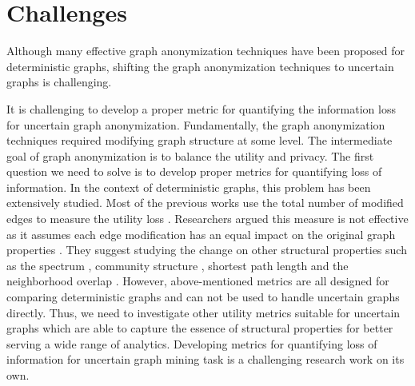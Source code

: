 \vspace{-1em}
\section{Challenges}
\vspace{-1em}
\label{sec:challenges}
Although many effective graph anonymization techniques have been proposed for deterministic graphs, shifting the graph anonymization techniques to uncertain graphs is challenging. 

It is challenging to develop a proper metric for quantifying the information loss for uncertain graph anonymization. Fundamentally, the graph anonymization techniques required modifying graph structure at some level. The intermediate goal of graph anonymization is to balance the utility and privacy. The first question we need to solve is to develop proper metrics for quantifying loss of information. In the context of deterministic graphs, this problem has been extensively studied. Most of the previous works use the total number of modified edges to measure the utility loss \cite{Liu_Towards_2008,Boldi_Injecting_2012}. Researchers argued this measure is not effective as it assumes each edge modification has an equal impact on the original graph properties \cite{Wang2011}. They suggest studying the change on other structural properties such as the spectrum \cite{Ying_Randomizing_2008}, community structure \cite{Wang2011}, shortest path length and the neighborhood overlap \cite{Ninggal_Utility_2015}. However, above-mentioned metrics are all designed for comparing deterministic graphs and can not be used to handle uncertain graphs directly. Thus, we need to investigate other utility metrics suitable for uncertain graphs which are able to capture the essence of structural properties for better serving a wide range of analytics. Developing metrics for quantifying loss of information for uncertain graph mining task is a challenging research work on its own. 

